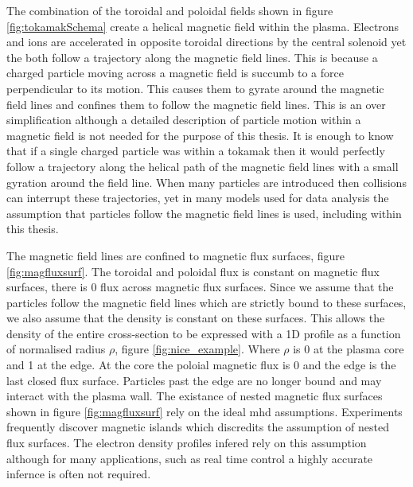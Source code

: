 The combination of the toroidal and poloidal fields shown in figure \ref{fig:tokamakSchema} create a helical magnetic field within the plasma. Electrons and ions are accelerated in opposite toroidal directions by the central solenoid yet the both follow a trajectory along the magnetic field lines. This is because a charged particle moving across a magnetic field is succumb to a force perpendicular to its motion. This causes them to gyrate around the magnetic field lines and confines them to follow the magnetic field lines. This is an over simplification although a detailed description of particle motion within a magnetic field is not needed for the purpose of this thesis. It is enough to know that if a single charged particle was within a tokamak then it would perfectly follow a trajectory along the helical path of the magnetic field lines with a small gyration around the field line. When many particles are introduced then collisions can interrupt these trajectories, yet in many models used for data analysis the assumption that particles follow the magnetic field lines is used, including within this thesis. 

The magnetic field lines are confined to magnetic flux surfaces, figure \ref{fig:magfluxsurf}. The toroidal and poloidal flux is constant on magnetic flux surfaces, there is 0 flux across magnetic flux surfaces. Since we assume that the particles follow the magnetic field lines which are strictly bound to these surfaces, we also assume that the density is constant on these surfaces. This allows the density of the entire cross-section to be expressed with a 1D profile as a function of normalised radius $\rho$, figure \ref{fig:nice_example}. Where $\rho$ is 0 at the plasma core and 1 at the edge. At the core the poloial magnetic flux is 0 and the edge is the last closed flux surface. Particles past the edge are no longer bound and may interact with the plasma wall. The existance of nested magnetic flux surfaces shown in figure \ref{fig:magfluxsurf} rely on the ideal \gls{mhd} assumptions. Experiments frequently discover magnetic islands which discredits the assumption of nested flux surfaces. The electron density profiles infered rely on this assumption although for many applications, such as real time control a highly accurate infernce is often not required.

